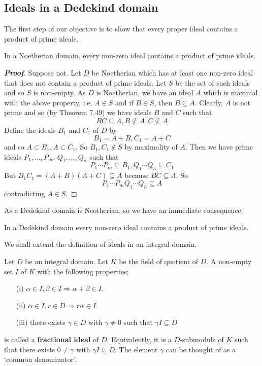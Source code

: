 \subsection{Ideals in a Dedekind domain}
The first step of our objective is to show that every proper ideal contains a product of prime ideals.
\begin{theorem} In a Noetherian domain, every non-zero ideal contains a product of prime ideals.
\end{theorem}
\begin{proof}[\bf Proof] Suppose not. Let $D$ be Noetherian which has at least one non-zero ideal that does not contain a product of prime ideals. Let $S$ be the set of such ideals and so $S$ is non-empty. As $D$ is Noetherian, we have an ideal $A$ which is maximal with the above property, i.e. $A \in S$ and if $B \in S$, then $B \subseteq A$. Clearly, $A$ is not prime and so (by Theorem 7.49) we have ideals $B$ and $C$ such that
$$BC \subseteq A, B \not \subseteq A, C \not \subseteq A$$
Define the ideals $B_1$ and $C_1$ of $D$ by
$$B_1=A+B,C_1=A+C$$
and so $A \subset B_1, A\subset C_1$. So $B_1,C_1 \not \in S$ by maximality of $A$.
Then we have prime ideals $P_1,\ldots,P_m$, $Q_1,\ldots,Q_n$ such that
$$P_1\cdots P_m \subseteq B_1,Q_1\cdots Q_n \subseteq C_1$$
But $B_1C_1=(A+B)(A+C) \subseteq A$ because $BC \subseteq A$. So
$$P_1\cdots P_m Q_1\cdots Q_n \subseteq A$$
contradicting $A \in S$.
\end{proof}
As a Dedekind domain is Neotherian, so we have an immediate consequence:
\begin{theorem} In a Dedekind domain every non-zero ideal contains a product of prime ideals.
\end{theorem}
We shall extend the definition of ideals in an integral domain.
\begin{definition} Let $D$ be an integral domain. Let $K$ be the field of quotient of $D$. A non-empty set $I$ of $K$ with the following properties:
\begin{enumerate}
\item[(i)] $\alpha \in I,\beta \in I \Rightarrow \alpha+\beta \in I$.
\item[(ii)] $\alpha \in I, r \in D \Rightarrow r \alpha \in I$.
\item[(iii)] there exists $\gamma \in D$ with $\gamma \neq 0$ such that $\gamma I \subseteq D$
\end{enumerate}
is called a {\bf fractional ideal} of $D$. Equivalently, it is a $D$-submodule of $K$ such that there exists $0 \neq \gamma$ with $\gamma I \subseteq D$. The element $\gamma$ can be thought of as a  `common denominator'.
\end{definition}
